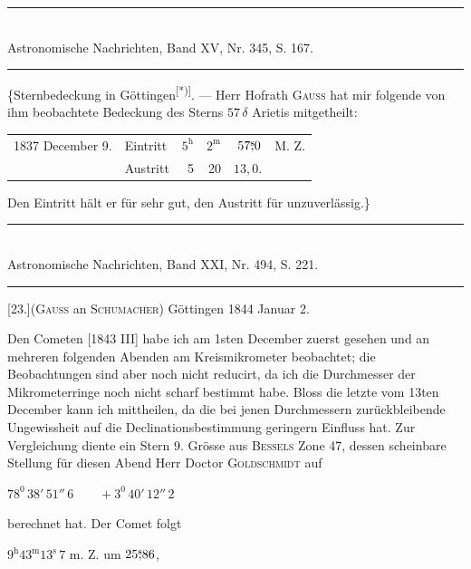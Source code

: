 \clearpage\begingroup

\noindent [22.]
\begin{center}\small
\rule{.78\textwidth}{.35pt}\\[.2em]
Astronomische Nachrichten, Band XV, Nr. 345, S. 167.\\[-.2em]
\rule{.78\textwidth}{.35pt}
\end{center}
\noindent\hspace*{\parindent}\{Sternbedeckung in Göttingen\textsuperscript{[*)]}. — Herr Hofrath \textsc{Gauss} hat mir folgende von ihm beobachtete Bedeckung des Sterns $57\,\delta$ Arietis mitgetheilt:
\begin{center}\begin{tabular}{llrrrl}
1837 December 9.&Eintritt&$5^{\mathrm h}$&$2^{\mathrm m}$&$57\mathord{\overset{\mathrm{s}}{,}}0$&M. Z.\\
&Austritt&5&20&$13{,}0$.&
\end{tabular}\end{center}
\noindent\hspace*{\parindent}Den Eintritt hält er für sehr gut, den Austritt für unzuverlässig.\}
\begin{center}\small
\rule{.78\textwidth}{.35pt}\\[.2em]
Astronomische Nachrichten, Band XXI, Nr. 494, S. 221.\\[-.2em]
\rule{.78\textwidth}{.35pt}
\end{center}
\begin{center}[23.]\quad (\textsc{Gauss} an \textsc{Schumacher}) Göttingen 1844 Januar 2.\end{center}
\noindent\hspace*{\parindent}Den Cometen [1843 III] habe ich am 1sten December zuerst gesehen und an mehreren folgenden Abenden am Kreismikrometer beobachtet; die Beobachtungen sind aber noch nicht reducirt, da ich die Durchmesser der Mikrometerringe noch nicht scharf bestimmt habe. Bloss die letzte vom 13ten December kann ich mittheilen, da die bei jenen Durchmessern zurückbleibende Ungewissheit auf die Declinationsbestimmung geringern Einfluss hat. Zur Vergleichung diente ein Stern 9. Grösse aus \textsc{Bessels} Zone 47, dessen scheinbare Stellung für diesen Abend Herr Doctor \textsc{Goldschmidt} auf
\begin{center}$78^0\,38'\,51''\,6\qquad+3^0\,40'\,12''\,2$\end{center}
\noindent berechnet hat. Der Comet folgt
\begin{center}$9^{\mathrm h}43^{\mathrm m}13^{\mathrm s}\,7$ m. Z. um $25\mathord{\overset{\mathrm{s}}{,}}86$,\end{center}

